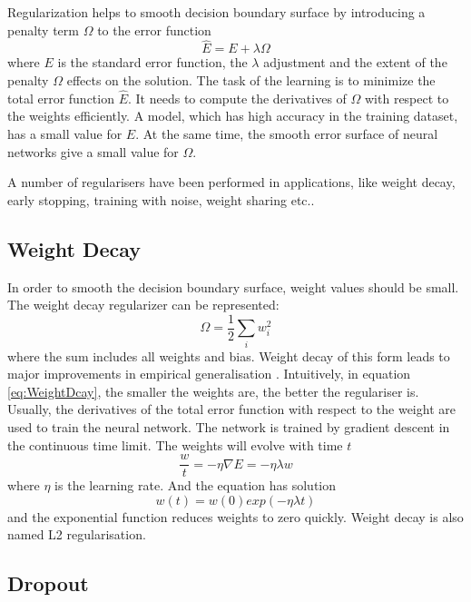 Regularization helps to smooth decision boundary surface by introducing a penalty term $\Omega$ to the error function
\begin{equation}\label{eq:Regularization}
\hat{E} = E + \lambda\Omega
\end{equation}
where $E$ is the standard error function, the $\lambda$ adjustment and the extent of the penalty $\Omega$ effects on the solution. The task of the learning is to minimize the total error function $\hat{E}$. It needs to compute the derivatives of $\Omega$ with respect to the weights efficiently. A model, which has high accuracy in the training dataset, has a small value for $E$. At the same time, the smooth error surface of neural networks give a small value for $\Omega$.

A number of regularisers have been performed in applications, like weight decay, early stopping, training with noise, weight sharing etc..

\subsection{Weight Decay}

In order to smooth the decision boundary surface, weight values should be small. The weight decay regularizer can be represented:
\begin{equation}\label{eq:WeightDcay}
\Omega = \frac{1}{2} \sum_i w_{i}^2
\end{equation}
where the sum includes all weights and bias. Weight decay of this form leads to major improvements in empirical generalisation \citep{hinton1987learning}. Intuitively, in equation \ref{eq:WeightDcay}, the smaller the weights are, the better the regulariser is. Usually, the derivatives of the total error function with respect to the weight are used to train the neural network. The network is trained by gradient descent in the continuous time limit. The weights will evolve with time $t$
\begin{equation}\label{eq:WeightDecayTime}
\frac{w}{t} = -\eta\nabla E = -\eta\lambda w
\end{equation}
where $\eta$ is the learning rate. And the equation has solution
\begin{equation}\label{eq:WeightDecaySolution}
w(t) = w(0)exp(-\eta\lambda t)
\end{equation}
and the exponential function reduces weights to zero quickly. Weight decay is also named L2 regularisation.

\subsection{Dropout}

